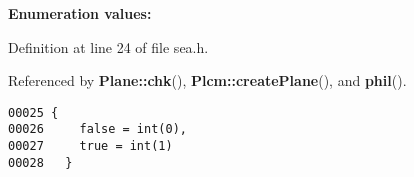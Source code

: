 \begin{Desc}
\item[{\bf Enumeration values:}]\par
\begin{description}
\item[
\label{sea.h_a1}
{\em false}]\item[
\label{sea.h_a2}
{\em true}]\end{description}
\end{Desc}



Definition at line 24 of file sea.h.

Referenced by {\bf Plane::chk}(), {\bf Plcm::create\-Plane}(), and {\bf phil}().\small\begin{verbatim}00025 {
00026     false = int(0),
00027     true = int(1)
00028   }
\end{verbatim}\normalsize 
